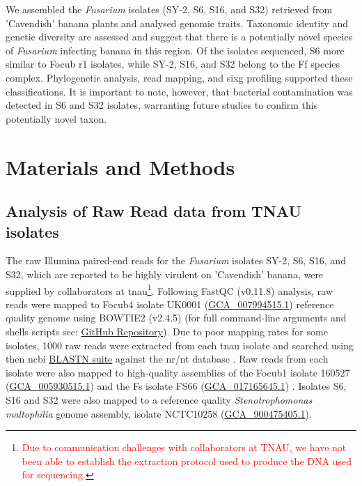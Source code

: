 We assembled the \textit{Fusarium} isolates (SY-2, S6, S16, and S32) retrieved from 'Cavendish' banana plants and analysed genomic traits. Taxonomic identity and genetic diversity are assessed and suggest that there is a potentially novel species of \textit{Fusarium} infecting banana in this region. Of the isolates sequenced, S6 more similar to \ac{Focub} \ac{r1} isolates, while SY-2, S16, and S32 belong to the \acf{Ff} species complex. Phylogenetic analysis, read mapping, and \ac{sixg} profiling supported these classifications. It is important to note, however, that bacterial contamination was detected in S6 and S32 isolates, warranting future studies to confirm this potentially novel taxon.

\newpage
\section{Materials and Methods}

\subsection{Analysis of Raw Read data from TNAU isolates}

The raw Illumina paired-end reads for the \textit{Fusarium} isolates SY-2, S6, S16, and S32, which are reported to be highly virulent on 'Cavendish' banana, were supplied by collaborators at \ac{tnau}\footnote{\textcolor{red}{Due to communication challenges with collaborators at TNAU, we have not been able to establish the extraction protocol used to produce the DNA used for sequencing.}}. Following FastQC (v0.11.8)
\parencite{Andrews2010} analysis, raw reads were mapped to \ac{Focub4}  isolate UK0001 (\href{https://www.ncbi.nlm.nih.gov/datasets/genome/GCA_007994515.1/}{GCA\_007994515.1}) \parencite{Warmington2019} reference quality genome using BOWTIE2 (v2.4.5) \parencite{Langmead2012} (for full command-line arguments and shells scripts see: \href{https://github.com/JamiePike/NewTools-Project/blob/master/docs/Assembly/AssemblyNotes.md}{GitHub Repository}). Due to poor mapping rates for some isolates, 1000 raw reads were extracted from each \ac{tnau} isolate and searched using then \ac{ncbi} \href{https://blast.ncbi.nlm.nih.gov/Blast.cgi?PROGRAM=blastn&BLAST_SPEC=GeoBlast&PAGE_TYPE=BlastSearch}{BLASTN suite} against the nr/nt database \parencite{Nih2014}. Raw reads from each isolate were also mapped to high-quality assemblies of the \ac{Focub1} isolate 160527 (\href{https://www.ncbi.nlm.nih.gov/datasets/genome/GCA_005930515.1/}{GCA\_005930515.1}) \parencite{Asai2019} and the \ac{Fs} isolate FS66 (\href{https://www.ncbi.nlm.nih.gov/datasets/genome/GCA_017165645.1/}{GCA\_017165645.1}) \parencite{Cui2021}. Isolates S6, S16 and S32 were also mapped to a reference quality \textit{Stenotrophomonas maltophilia} genome assembly, isolate NCTC10258 (\href{https://www.ncbi.nlm.nih.gov/datasets/genome/GCF_900475405.1/}{GCA\_900475405.1}). 

